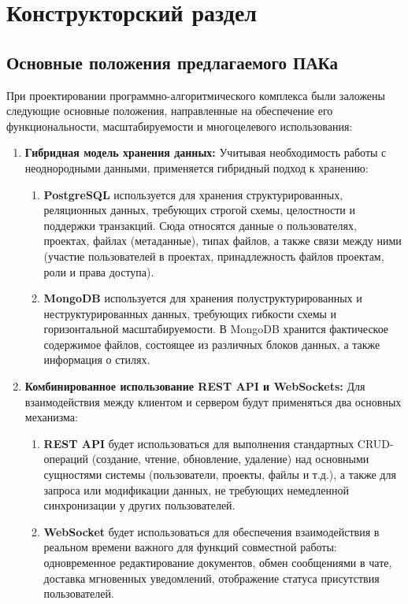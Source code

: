 \chapter{Конструкторский раздел}

\section{Основные положения предлагаемого ПАКа}

При проектировании программно-алгоритмического комплекса были заложены следующие основные положения, направленные на обеспечение его функциональности, масштабируемости и многоцелевого использования:

\begin{enumerate}[wide=12.5mm, leftmargin=12.5mm]
    \item \textbf{Гибридная модель хранения данных:} Учитывая необходимость работы с неоднородными данными, применяется гибридный подход к хранению:
        \begin{enumerate}[wide=12.5mm, leftmargin=12.5mm]
            \item \textbf{PostgreSQL} используется для хранения структурированных, реляционных данных, требующих строгой схемы, целостности и поддержки транзакций. Сюда относятся данные о пользователях, проектах, файлах (метаданные), типах файлов, а также связи между ними (участие пользователей в проектах, принадлежность файлов проектам, роли и права доступа).
            \item \textbf{MongoDB} используется для хранения полуструктурированных и неструктурированных данных, требующих гибкости схемы и горизонтальной масштабируемости. В MongoDB хранится фактическое содержимое файлов, состоящее из различных блоков данных, а также информация о стилях.
        \end{enumerate}
    \item \textbf{Комбинированное использование REST API и WebSockets:} Для взаимодействия между клиентом и сервером будут применяться два основных механизма:
        \begin{enumerate}[wide=12.5mm, leftmargin=12.5mm]
            \item \textbf{REST API} будет использоваться для выполнения стандартных CRUD-операций (создание, чтение, обновление, удаление) над основными сущностями системы (пользователи, проекты, файлы и т.д.), а также для запроса или модификации данных, не требующих немедленной синхронизации у других пользователей.
            \item \textbf{WebSocket} будет использоваться для обеспечения взаимодействия в реальном времени важного для функций совместной работы: одновременное редактирование документов, обмен сообщениями в чате, доставка мгновенных уведомлений, отображение статуса присутствия пользователей.

\end{enumerate}
\end{enumerate}
